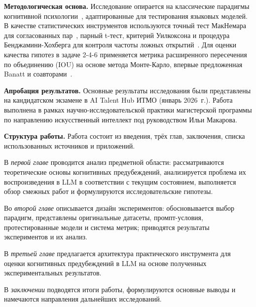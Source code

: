 \textbf{Методологическая основа.}
Исследование опирается на классические парадигмы когнитивной психологии~\cite{tversky1983extensional, wason1966reasoning, wason1960failure}, адаптированные для тестирования языковых моделей. В качестве статистических инструментов используются точный тест МакНемара для согласованных пар~\cite{mcnemar1947note}, парный t-тест, критерий Уилкоксона и процедура Бенджамини-Хохберга для контроля частоты ложных открытий~\cite{benjamini1995controlling}. Для оценки качества гипотез в задаче 2-4-6 применяется метрика расширенного пересечения по объединению (IOU) на основе метода Монте-Карло, впервые предложенная Banatt и соавторами~\cite{banatt2024wilt}.

\textbf{Апробация результатов.}
Основные результаты исследования были представлены на кандидатском экзамене в AI Talent Hub ИТМО (январь 2026~г.). Работа выполнена в рамках научно-исследовательской практики магистерской программы по направлению искусственный интеллект под руководством Ильи Макарова.

\textbf{Структура работы.}
Работа состоит из введения, трёх глав, заключения, списка использованных источников и приложений.

В \textit{первой главе} проводится анализ предметной области: рассматриваются теоретические основы когнитивных предубеждений, анализируется проблема их воспроизведения в LLM в соответствии с текущим состоянием, выполняется обзор смежных работ и формулируются исследовательские гипотезы.

Во \textit{второй главе} описывается дизайн экспериментов: обосновывается выбор парадигм, представлены оригинальные датасеты, промпт-условия, протестированные модели и система метрик; приводятся результаты экспериментов и их анализ.

В \textit{третьей главе} предлагается архитектура практического инструмента для оценки когнитивных предубеждений в LLM на основе полученных экспериментальных результатов.

В \textit{заключении} подводятся итоги работы, формулируются основные выводы и намечаются направления дальнейших исследований.